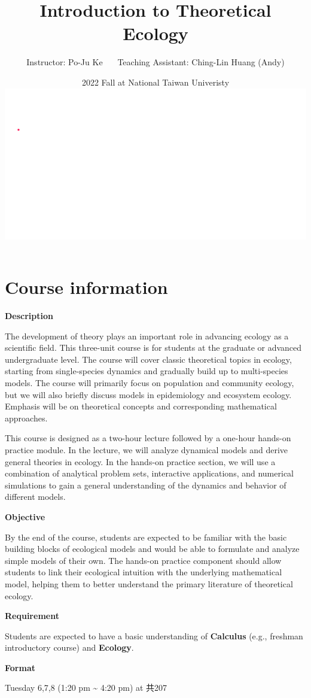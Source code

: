 \documentclass[
]{book}
\title{Introduction to Theoretical Ecology}
\author{Instructor: Po-Ju Ke \(~~~~~\) Teaching Assistant: Ching-Lin Huang (Andy)}
\date{2022 Fall at National Taiwan Univeristy \includegraphics{./bifurcation.gif}}
\begin{document}
\maketitle

{
\setcounter{tocdepth}{1}
\tableofcontents
}
\hypertarget{course-information}{%
\chapter*{Course information}\label{course-information}}

\textbf{Description}

The development of theory plays an important role in advancing ecology as a scientific field. This three-unit course is for students at the graduate or advanced undergraduate level. The course will cover classic theoretical topics in ecology, starting from single-species dynamics and gradually build up to multi-species models. The course will primarily focus on population and community ecology, but we will also briefly discuss models in epidemiology and ecosystem ecology. Emphasis will be on theoretical concepts and corresponding mathematical approaches.

This course is designed as a two-hour lecture followed by a one-hour hands-on practice module. In the lecture, we will analyze dynamical models and derive general theories in ecology. In the hands-on practice section, we will use a combination of analytical problem sets, interactive applications, and numerical simulations to gain a general understanding of the dynamics and behavior of different models.

\textbf{Objective}

By the end of the course, students are expected to be familiar with the basic building blocks of ecological models and would be able to formulate and analyze simple models of their own. The hands-on practice component should allow students to link their ecological intuition with the underlying mathematical model, helping them to better understand the primary literature of theoretical ecology.

\textbf{Requirement}

Students are expected to have a basic understanding of \textbf{Calculus} (e.g., freshman introductory course) and \textbf{Ecology}.

\textbf{Format}

Tuesday 6,7,8 (1:20 pm \textasciitilde{} 4:20 pm) at 共207
\end{document}
